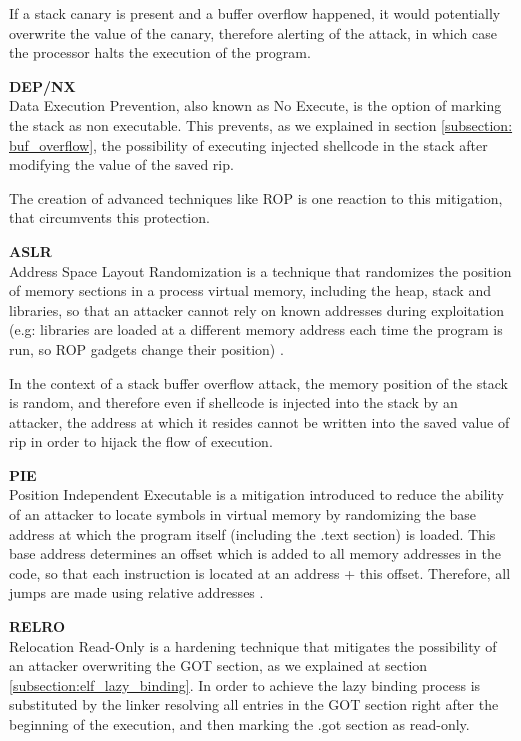 If a stack canary is present and a buffer overflow happened, it would potentially overwrite the value of the canary, therefore alerting of the attack, in which case the processor halts the execution of the program.

\textbf{DEP/NX}\\
Data Execution Prevention, also known as No Execute, is the option of marking the stack as non executable. This prevents, as we explained in section \ref{subsection: buf_overflow}, the possibility of executing injected shellcode in the stack after modifying the value of the saved rip.

The creation of advanced techniques like ROP is one reaction to this mitigation, that circumvents this protection.

\textbf{ASLR}\\
Address Space Layout Randomization is a technique that randomizes the position of memory sections in a process virtual memory, including the heap, stack and libraries, so that an attacker cannot rely on known addresses during exploitation (e.g: libraries are loaded at a different memory address each time the program is run, so ROP gadgets change their position) \cite{aslr_pie_intro}.

In the context of a stack buffer overflow attack, the memory position of the stack is random, and therefore even if shellcode is injected into the stack by an attacker, the address at which it resides cannot be written into the saved value of rip in order to hijack the flow of execution.

\textbf{PIE}\\
Position Independent Executable is a mitigation introduced to reduce the ability of an attacker to locate symbols in virtual memory by randomizing the base address at which the program itself (including the .text section) is loaded. This base address determines an offset which is added to all memory addresses in the code, so that each instruction is located at an address + this offset. Therefore, all jumps are made using relative addresses \cite{aslr_pie_intro}.

\textbf{RELRO}\\
Relocation Read-Only is a hardening technique that mitigates the possibility of an attacker overwriting the GOT section, as we explained at section \ref{subsection:elf_lazy_binding}. In order to achieve the lazy binding process is substituted by the linker resolving all entries in the GOT section right after the beginning of the execution, and then marking the .got section as read-only. 

